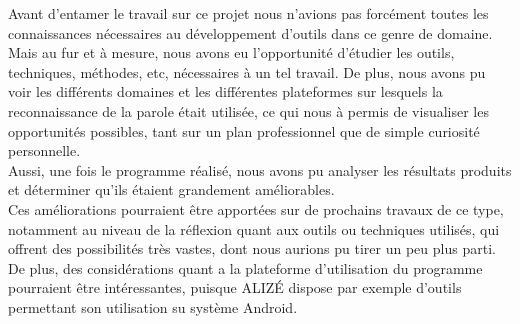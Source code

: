 \documentclass[a4paper, 12pt]{book}
\newcounter{program}[subsection]
\begin{document}
Avant d'entamer le travail sur ce projet nous n'avions pas forcément toutes les connaissances nécessaires au développement d'outils dans ce genre de domaine.
Mais au fur et à mesure, nous avons eu l'opportunité d'étudier les outils, techniques, méthodes, etc, nécessaires à un tel travail.
De plus, nous avons pu voir les différents domaines et les différentes plateformes sur lesquels la reconnaissance de la parole était utilisée, ce qui nous à permis de visualiser les opportunités possibles, tant sur un plan professionnel que de simple curiosité personnelle.\\

Aussi, une fois le programme réalisé, nous avons pu analyser les résultats produits et déterminer qu'ils étaient grandement améliorables.\\

Ces améliorations pourraient être apportées sur de prochains travaux de ce type, notamment au niveau de la réflexion quant aux outils ou techniques utilisés, qui offrent des possibilités très vastes, dont nous aurions pu tirer un peu plus parti. De plus, des considérations quant a la plateforme d'utilisation du programme pourraient être intéressantes, puisque ALIZÉ dispose par exemple d'outils permettant son utilisation su système Android.
\end{document}

